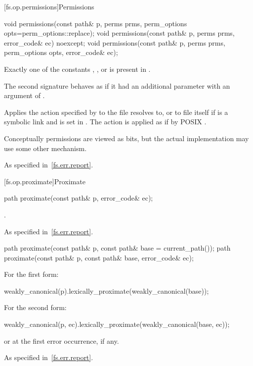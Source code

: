 [fs.op.permissions]{Permissions}

%
\begin{itemdecl}
void permissions(const path& p, perms prms, perm_options opts=perm_options::replace);
void permissions(const path& p, perms prms, error_code& ec) noexcept;
void permissions(const path& p, perms prms, perm_options opts, error_code& ec);
\end{itemdecl}

\begin{itemdescr}
\pnum
\expects
Exactly one of the  constants
, , or  is present in .

\pnum
\remarks
The second signature behaves as if it had an additional parameter
  with an argument of .

\pnum
\effects
Applies the action specified by 
to the file  resolves to,
or to file  itself if  is a symbolic link
and  is set in .
The action is applied as if by POSIX .

\pnum
\begin{note}
Conceptually permissions are viewed as bits, but the actual
implementation may use some other mechanism.
\end{note}

\pnum
\throws
As specified in~\ref{fs.err.report}.
\end{itemdescr}

[fs.op.proximate]{Proximate}

%
\begin{itemdecl}
path proximate(const path& p, error_code& ec);
\end{itemdecl}

\begin{itemdescr}
\pnum
\returns
{}.

\pnum
\throws
As specified in~\ref{fs.err.report}.
\end{itemdescr}

%
\begin{itemdecl}
path proximate(const path& p, const path& base = current_path());
path proximate(const path& p, const path& base, error_code& ec);
\end{itemdecl}

\begin{itemdescr}
\pnum
\returns
For the first form:
\begin{codeblock}
weakly_canonical(p).lexically_proximate(weakly_canonical(base));
\end{codeblock}
  For the second form:
\begin{codeblock}
weakly_canonical(p, ec).lexically_proximate(weakly_canonical(base, ec));
\end{codeblock}
  or  at the first error occurrence, if any.

\pnum
\throws
As specified in~\ref{fs.err.report}.
\end{itemdescr}

